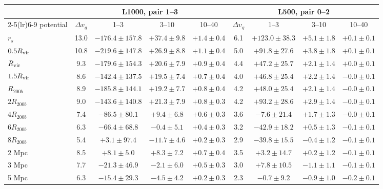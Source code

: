 \begin{tabular}{lcccccccc}
\toprule
 & \multicolumn{4}{c}{L1000, pair 1–3} & \multicolumn{4}{c}{L500, pair 0–2} \\
\cmidrule(lr){2-5}\cmidrule(lr){6-9}
potential & $\Delta v_g$ & 1–3 & 3–10 & 10–40 & $\Delta v_g$ & 1–3 & 3–10 & 10–40 \\
\midrule
$r_s$ & 13.0 & $-176.4\pm157.8$ & $+37.4\pm9.8$ & $+1.4\pm0.4$ & 6.1 & $+123.0\pm38.3$ & $+5.1\pm1.8$ & $+0.1\pm0.1$ \\
$0.5R_{\rm vir}$ & 10.8 & $-219.6\pm147.8$ & $+26.9\pm8.8$ & $+1.1\pm0.4$ & 5.0 & $+91.8\pm27.6$ & $+3.8\pm1.8$ & $+0.1\pm0.1$ \\
$R_{\rm vir}$ & 9.3 & $-179.6\pm154.3$ & $+20.6\pm7.9$ & $+0.9\pm0.4$ & 4.4 & $+47.2\pm25.7$ & $+2.1\pm1.4$ & $+0.0\pm0.1$ \\
$1.5R_{\rm vir}$ & 8.6 & $-142.4\pm137.5$ & $+19.5\pm7.4$ & $+0.7\pm0.4$ & 4.0 & $+46.8\pm25.4$ & $+2.2\pm1.4$ & $-0.0\pm0.1$ \\
$R_{200b}$ & 8.9 & $-185.8\pm144.1$ & $+19.2\pm7.7$ & $+0.8\pm0.4$ & 4.2 & $+48.0\pm25.4$ & $+2.1\pm1.4$ & $-0.0\pm0.1$ \\
\midrule
$2R_{200b}$ & 9.0 & $-143.6\pm140.8$ & $+21.3\pm7.9$ & $+0.8\pm0.3$ & 4.2 & $+93.2\pm28.6$ & $+2.9\pm1.4$ & $-0.0\pm0.1$ \\
$4R_{200b}$ & 7.4 & $-86.5\pm80.1$ & $+9.4\pm6.8$ & $+0.6\pm0.3$ & 3.6 & $-7.6\pm21.4$ & $+1.7\pm1.3$ & $-0.0\pm0.1$ \\
$6R_{200b}$ & 6.3 & $-66.4\pm68.8$ & $-0.4\pm5.1$ & $+0.4\pm0.3$ & 3.2 & $-42.9\pm18.2$ & $+0.5\pm1.3$ & $-0.1\pm0.1$ \\
$8R_{200b}$ & 5.4 & $+3.1\pm97.4$ & $-11.7\pm4.6$ & $+0.2\pm0.3$ & 2.9 & $-39.8\pm15.5$ & $-0.4\pm1.2$ & $-0.1\pm0.1$ \\
2 Mpc & 8.5 & $+8.1\pm5.0$ & $+8.3\pm7.2$ & $+0.7\pm0.4$ & 3.5 & $+3.2\pm14.7$ & $+0.2\pm1.2$ & $-0.1\pm0.1$ \\
3 Mpc & 7.7 & $-21.3\pm46.9$ & $-2.1\pm6.0$ & $+0.5\pm0.3$ & 3.0 & $+7.8\pm10.5$ & $-1.1\pm1.1$ & $-0.1\pm0.1$ \\
5 Mpc & 6.3 & $-15.4\pm29.3$ & $-4.5\pm4.2$ & $+0.2\pm0.3$ & 2.3 & $-0.7\pm9.2$ & $-0.9\pm1.0$ & $-0.2\pm0.1$ \\
\bottomrule
\end{tabular}
